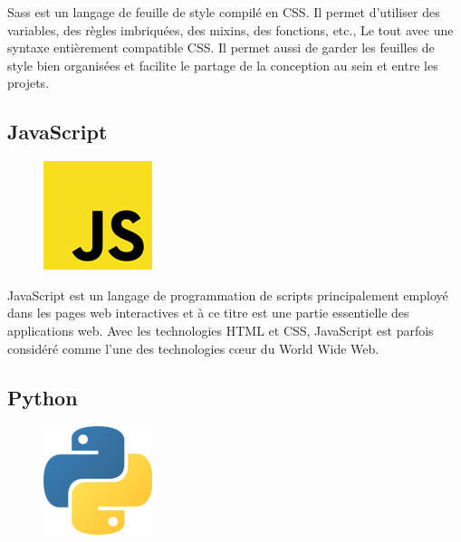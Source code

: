 Sass est un langage de feuille de style compilé en CSS. Il permet d'utiliser des 
variables, des règles imbriquées, des mixins, des fonctions, etc., Le tout 
avec une syntaxe entièrement compatible CSS. Il permet aussi de garder les 
feuilles de style bien organisées et facilite le partage de la conception au 
sein et entre les projets\cite{46}.

\clearpage        

\subsection{JavaScript}
\begin{figure}
    \vspace{-22pt}
    \begin{center}
        \includegraphics[scale=0.36]{images/logo/js.png}
        \label{fig73}
    \end{center}
    \vspace{-20pt}
    \vspace{-10pt}
\end{figure}

JavaScript est un langage de programmation de scripts principalement employé 
dans les pages web interactives et à ce titre est une partie essentielle des 
applications web. Avec les technologies HTML et CSS, JavaScript est parfois 
considéré comme l'une des technologies cœur du World Wide Web\cite{16}.     

\subsection{Python}
\begin{figure}
    \vspace{-22pt}
    \begin{center}
        \includegraphics[scale=0.36]{images/logo/python.png}
        \label{fig74}
    \end{center}
    \vspace{-20pt}
    \vspace{-10pt}
\end{figure}

